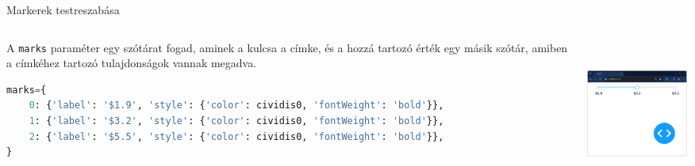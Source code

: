 \documentclass[english, aspectratio=169]{beamer}
\begin{document}
	\begin{frame}[fragile]{Markerek testreszabása}
		\begin{columns}
			\begin{column}{.5\textwidth}
				A \texttt{marks} paraméter egy szótárat fogad, aminek a kulcsa a címke, és a hozzá tartozó érték egy másik szótár, amiben a címkéhez tartozó tulajdonságok vannak megadva.
				\begin{lstlisting}[language=python]
marks={
	0: {'label': '$1.9', 'style': {'color': cividis0, 'fontWeight': 'bold'}},
	1: {'label': '$3.2', 'style': {'color': cividis0, 'fontWeight': 'bold'}},
	2: {'label': '$5.5', 'style': {'color': cividis0, 'fontWeight': 'bold'}},
}				
				\end{lstlisting}
			\end{column}
			\begin{column}{.5\textwidth}
				\begin{center}
					\includegraphics[width=5cm, height=5cm, keepaspectratio]{images/scatter_18.png}
				\end{center}
			\end{column}
		\end{columns}
	\end{frame}
	
\end{document}
